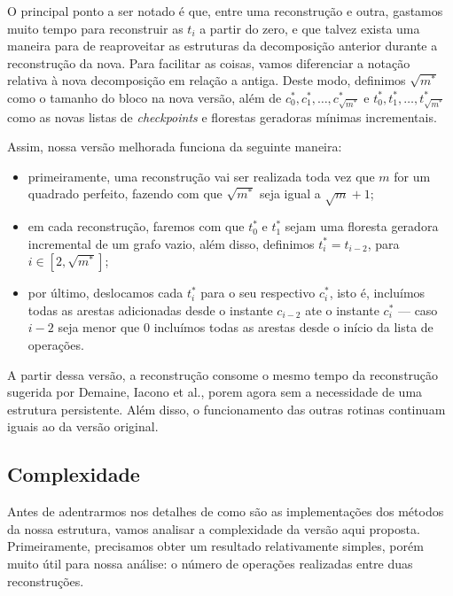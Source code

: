 O principal ponto a ser notado é que, entre uma reconstrução e outra, gastamos muito tempo para reconstruir as $t_i$ a partir do zero, e que talvez exista uma maneira para de reaproveitar as estruturas da decomposição anterior durante a reconstrução da nova. Para facilitar as coisas, vamos diferenciar a notação relativa à nova decomposição em relação a antiga. Deste modo, definimos $\sqrt{m^*}$ como o tamanho do bloco na nova versão, além de $c_0^*, c_1^*, \dots, c_{\sqrt{m^*}}^*$ e $t_0^*, t_1^*, \dots, t_{\sqrt{m^*}}^*$ como as novas listas de \emph{checkpoints} e florestas geradoras mínimas incrementais.

Assim, nossa versão melhorada funciona da seguinte maneira:

\begin{itemize}
    \item primeiramente, uma reconstrução vai ser realizada toda vez que $m$ for um quadrado perfeito, fazendo com que $\sqrt{m^*} $ seja igual a $\sqrt{m} + 1$;
    \item em cada reconstrução, faremos com que $t_0^*$ e $t_1^*$ sejam uma floresta geradora incremental de um grafo vazio, além disso, definimos $t_i^* = t_{i-2}$, para $i \in [2, \sqrt{m^*}]$;
    \item por último, deslocamos cada $t_i^*$ para o seu respectivo $c_i^*$, isto é, incluímos todas as arestas adicionadas desde o instante $c_{i-2}$ ate o instante $c_i^*$ --- caso $i-2$ seja menor que $0$ incluímos todas as arestas desde o início da lista de operações.
\end{itemize}

A partir dessa versão, a reconstrução consome o mesmo tempo da reconstrução sugerida por Demaine, Iacono et al., porem agora sem a necessidade de uma estrutura persistente. Além disso, o funcionamento das outras rotinas continuam iguais ao da versão original.

\subsection{Complexidade}
\label{sec:rmsf-complexidade}

Antes de adentrarmos nos detalhes de como são as implementações dos métodos da nossa estrutura, vamos analisar a complexidade da versão aqui proposta. Primeiramente, precisamos obter um resultado relativamente simples, porém muito útil para nossa análise: o número de operações realizadas entre duas reconstruções.

